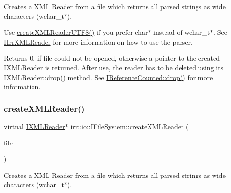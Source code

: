 Creates a X\+ML Reader from a file which returns all parsed strings as wide characters (wchar\+\_\+t$\ast$). 

Use \hyperlink{classirr_1_1io_1_1IFileSystem_affd8f622ac7c3dcd507f20f9cd23b21f}{create\+X\+M\+L\+Reader\+U\+T\+F8()} if you prefer char$\ast$ instead of wchar\+\_\+t$\ast$. See \hyperlink{classirr_1_1io_1_1IIrrXMLReader}{I\+Irr\+X\+M\+L\+Reader} for more information on how to use the parser. \begin{DoxyReturn}{Returns}
0, if file could not be opened, otherwise a pointer to the created I\+X\+M\+L\+Reader is returned. After use, the reader has to be deleted using its I\+X\+M\+L\+Reader\+::drop() method. See \hyperlink{classirr_1_1IReferenceCounted_a03856a09355b89d178090c4a5f738543}{I\+Reference\+Counted\+::drop()} for more information. 
\end{DoxyReturn}
\mbox{\label{classirr_1_1io_1_1IFileSystem_a38f4c90db3fd1b21473ce0cd2437bb59}} 
\subsubsection{\texorpdfstring{create\+X\+M\+L\+Reader()}{createXMLReader()}\hspace{0.1cm}{\footnotesize\ttfamily [2/2]}}
{\footnotesize\ttfamily virtual \hyperlink{namespaceirr_1_1io_a9dc6291fb7e4c73155a3e3c8339f9bff}{I\+X\+M\+L\+Reader}$\ast$ irr\+::io\+::\+I\+File\+System\+::create\+X\+M\+L\+Reader (\begin{DoxyParamCaption}\item[{\hyperlink{classirr_1_1io_1_1IReadFile}{I\+Read\+File} $\ast$}]{file }\end{DoxyParamCaption})\hspace{0.3cm}{\ttfamily [pure virtual]}}



Creates a X\+ML Reader from a file which returns all parsed strings as wide characters (wchar\+\_\+t$\ast$). 

